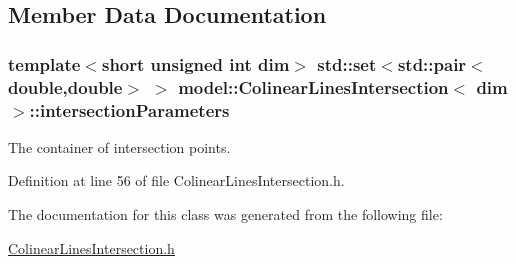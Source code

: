 \subsection{Member Data Documentation}
\hypertarget{classmodel_1_1_colinear_lines_intersection_a5a5456972981a546e59d45aba059480d}{}
\subsubsection[{intersection\+Parameters}]{\setlength{\rightskip}{0pt plus 5cm}template$<$short unsigned int dim$>$ {\bf std\+::set}$<$std\+::pair$<$double,double$>$ $>$ {\bf model\+::\+Colinear\+Lines\+Intersection}$<$ {\bf dim} $>$\+::intersection\+Parameters}\label{classmodel_1_1_colinear_lines_intersection_a5a5456972981a546e59d45aba059480d}


The container of intersection points. 



Definition at line 56 of file Colinear\+Lines\+Intersection.\+h.



The documentation for this class was generated from the following file\+:\begin{DoxyCompactItemize}
\item 
\hyperlink{_colinear_lines_intersection_8h}{Colinear\+Lines\+Intersection.\+h}\end{DoxyCompactItemize}
